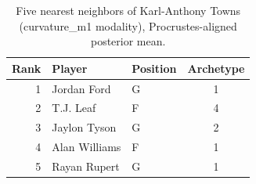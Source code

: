 \begin{table}[htbp]
  \centering\small
  \begin{tabular}{rllc}
    \toprule
    Rank & Player & Position & Archetype \\
    \midrule
    1 & Jordan Ford & G & 1 \\
    2 & T.J. Leaf & F & 4 \\
    3 & Jaylon Tyson & G & 2 \\
    4 & Alan Williams & F & 1 \\
    5 & Rayan Rupert & G & 1 \\
    \bottomrule
  \end{tabular}
  \caption{Five nearest neighbors of Karl-Anthony Towns (curvature_m1 modality), Procrustes-aligned posterior mean.}
  \label{tab:Karl_Anthony_Towns_neighbors_curvature_m1}
\end{table}

